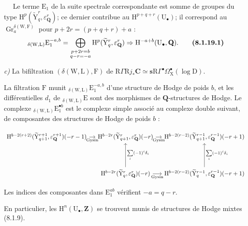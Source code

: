 \documentclass[11pt,leqno]{article}
\newcommand{\Page}[1]{\ifvmode\noindent\else\unskip\ \fi{\footnotesize\textcolor{gray}{[p.\,#1]}}\ \ignorespaces}
\begin{document}
\Page{35}
Le terme \(\mathrm{E}_{1}\) de la suite spectrale correspondante est somme de groupes du type \(\mathrm{H}^{p}(\widetilde{\mathrm{Y}}_{q}^{r},\varepsilon_{\mathbf{Q}}^{r})\); ce dernier contribue au \(\mathrm{H}^{p+q+r}(\mathrm{U}_{\bullet})\); il correspond au \(\operatorname{Gr}_{a}^{\delta(\mathrm{W},\mathrm{F})}\) pour \(p+2r=(p+q+r)+a\) :
\[
{}_{\delta(\mathrm{W},\mathrm{L})}\mathrm{E}_{1}^{-a,b}
=
\bigoplus_{\substack{p+2r=b\\q-r=-a}}
\mathrm{H}^{p}(\widetilde{\mathrm{Y}}_{q}^{r},\varepsilon_{\mathbf{Q}}^{r})
\Rightarrow
\mathrm{H}^{-a+b}(\mathrm{U}_{\bullet},\mathbf{Q}).
\tag*{\textbf{(8.1.19.1)}}
\]

\textit{c)} La bifiltration \((\delta(\mathrm{W},\mathrm{L}),\mathrm{F})\) de \(\mathrm{R}\Gamma\mathrm{R}j_{\ast}\mathbf{C}\simeq\mathbf{s}\mathrm{R}\Gamma^\bullet\Omega_{\mathrm{X}}^\bullet(\log\mathrm{D})\).

La filtration \(\mathrm{F}\) munit \({}_{\delta(\mathrm{W},\mathrm{L})}\mathrm{E}_{1}^{-a,b}\) d’une structure de Hodge de poids \(b\), et les différentielles \(d_{1}\) de \({}_{\delta(\mathrm{W},\mathrm{L})}\mathrm{E}\) sont des morphismes de \(\mathbf{Q}\)-structures de Hodge. Le complexe \({}_{\delta(\mathrm{W},\mathrm{L})}\mathrm{E}_{1}^{\bullet b}\) est le complexe simple associé au complexe double suivant, de composantes des structures de Hodge de poids \(b\) :

{\small
\[
\begin{tikzcd}[ampersand replacement=\&, column sep=1em, row sep=4em]
\mathrm{H}^{b-2(r+2)}
(\widetilde{\mathrm{Y}}_{q+1}^{r+1},\varepsilon_{\mathbf{Q}}^{r+1})(-r-1)
\arrow[r, "\mathrm{Gysin}"']
\&
\mathrm{H}^{b-2r}
(\widetilde{\mathrm{Y}}_{q+1}^{r},\varepsilon_{\mathbf{Q}}^{r})(-r)
\arrow[r, "\mathrm{Gysin}"']
\&
\mathrm{H}^{b-2(r-2)}
(\widetilde{\mathrm{Y}}_{q+1}^{r-1},\varepsilon_{\mathbf{Q}}^{r-1})(-r+1)
\\
\&
\mathrm{H}^{b-2r}
(\widetilde{\mathrm{Y}}_{q}^{r},\varepsilon_{\mathbf{Q}}^{r})(-r)
\arrow[u, "{\sum\limits_i(-1)^i\delta_i}"']
\arrow[r, "\mathrm{Gysin}"']
\&
\mathrm{H}^{b-2(r-2)}
(\widetilde{\mathrm{Y}}_{q}^{r-1},\varepsilon_{\mathbf{Q}}^{r-1})(-r+1)
\arrow[u, "{\sum\limits_i(-1)^i\delta_i}"']
\end{tikzcd}
\]
}

Les indices des composantes dans \(\mathrm{E}_{1}^{ab}\) vérifient \(-a=q-r\).

En particulier, les \(\mathrm{H}^{n}(\mathrm{U}_{\bullet},\mathbf{Z})\) se trouvent munis de structures de Hodge mixtes (8.1.9).
\end{document}
